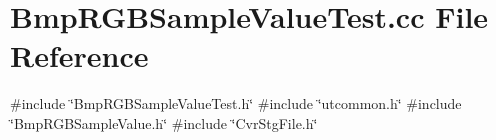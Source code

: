 \section{Bmp\+R\+G\+B\+Sample\+Value\+Test.\+cc File Reference}
\label{BmpRGBSampleValueTest_8cc}
{\ttfamily \#include \char`\"{}Bmp\+R\+G\+B\+Sample\+Value\+Test.\+h\char`\"{}}\newline
{\ttfamily \#include \char`\"{}utcommon.\+h\char`\"{}}\newline
{\ttfamily \#include \char`\"{}Bmp\+R\+G\+B\+Sample\+Value.\+h\char`\"{}}\newline
{\ttfamily \#include \char`\"{}Cvr\+Stg\+File.\+h\char`\"{}}\newline
